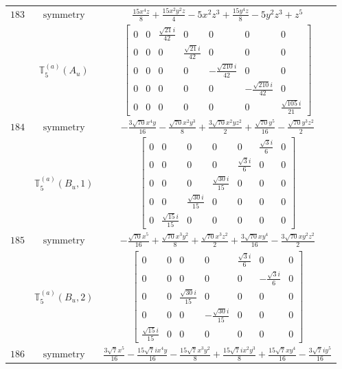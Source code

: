 \documentclass[fleqn,8pt,landscape]{jsarticle}
\begin{document}
\begin{longtable}{ccc}
$ 183 $ & $ \text{symmetry} $ & $ \frac{15 x^{4} z}{8} + \frac{15 x^{2} y^{2} z}{4} - 5 x^{2} z^{3} + \frac{15 y^{4} z}{8} - 5 y^{2} z^{3} + z^{5} $ \\
$  $ & $ \mathbb{T}_{5}^{(a)}(A_{u}) $ & $ \begin{bmatrix} 0 & 0 & \frac{\sqrt{21} i}{42} & 0 & 0 & 0 & 0 \\ 0 & 0 & 0 & \frac{\sqrt{21} i}{42} & 0 & 0 & 0 \\ 0 & 0 & 0 & 0 & - \frac{\sqrt{210} i}{42} & 0 & 0 \\ 0 & 0 & 0 & 0 & 0 & - \frac{\sqrt{210} i}{42} & 0 \\ 0 & 0 & 0 & 0 & 0 & 0 & \frac{\sqrt{105} i}{21} \end{bmatrix} $ \\ \hline
$ 184 $ & $ \text{symmetry} $ & $ - \frac{3 \sqrt{70} x^{4} y}{16} - \frac{\sqrt{70} x^{2} y^{3}}{8} + \frac{3 \sqrt{70} x^{2} y z^{2}}{2} + \frac{\sqrt{70} y^{5}}{16} - \frac{\sqrt{70} y^{3} z^{2}}{2} $ \\
$  $ & $ \mathbb{T}_{5}^{(a)}(B_{u},1) $ & $ \begin{bmatrix} 0 & 0 & 0 & 0 & 0 & \frac{\sqrt{3} i}{6} & 0 \\ 0 & 0 & 0 & 0 & \frac{\sqrt{3} i}{6} & 0 & 0 \\ 0 & 0 & 0 & \frac{\sqrt{30} i}{15} & 0 & 0 & 0 \\ 0 & 0 & \frac{\sqrt{30} i}{15} & 0 & 0 & 0 & 0 \\ 0 & \frac{\sqrt{15} i}{15} & 0 & 0 & 0 & 0 & 0 \end{bmatrix} $ \\ \hline
$ 185 $ & $ \text{symmetry} $ & $ - \frac{\sqrt{70} x^{5}}{16} + \frac{\sqrt{70} x^{3} y^{2}}{8} + \frac{\sqrt{70} x^{3} z^{2}}{2} + \frac{3 \sqrt{70} x y^{4}}{16} - \frac{3 \sqrt{70} x y^{2} z^{2}}{2} $ \\
$  $ & $ \mathbb{T}_{5}^{(a)}(B_{u},2) $ & $ \begin{bmatrix} 0 & 0 & 0 & 0 & \frac{\sqrt{3} i}{6} & 0 & 0 \\ 0 & 0 & 0 & 0 & 0 & - \frac{\sqrt{3} i}{6} & 0 \\ 0 & 0 & \frac{\sqrt{30} i}{15} & 0 & 0 & 0 & 0 \\ 0 & 0 & 0 & - \frac{\sqrt{30} i}{15} & 0 & 0 & 0 \\ \frac{\sqrt{15} i}{15} & 0 & 0 & 0 & 0 & 0 & 0 \end{bmatrix} $ \\ \hline
$ 186 $ & $ \text{symmetry} $ & $ \frac{3 \sqrt{7} x^{5}}{16} - \frac{15 \sqrt{7} i x^{4} y}{16} - \frac{15 \sqrt{7} x^{3} y^{2}}{8} + \frac{15 \sqrt{7} i x^{2} y^{3}}{8} + \frac{15 \sqrt{7} x y^{4}}{16} - \frac{3 \sqrt{7} i y^{5}}{16} $ \\

\end{longtable}
\end{document}
